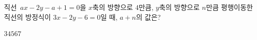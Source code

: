 직선~$ax-2y-a+1=0$을 $x$축의 방향으로 $4$만큼, $y$축의 방향으로 $n$만큼 평행이동한 직선의 방정식이 $3x-2y-6=0$일 때, $a+n$의 값은? 
\begin{choices32}{$3$}{$4$}{$5$}{$6$}{$7$}\end{choices32}
